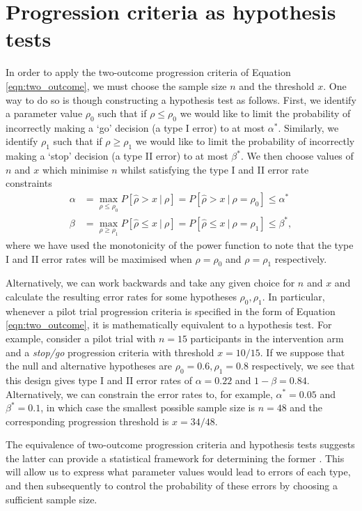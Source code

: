 \documentclass[sagev]{sagej}
\begin{document}
\section{Progression criteria as hypothesis tests}\label{sec:tests}

In order to apply the two-outcome progression criteria of Equation \ref{eqn:two_outcome}, we must choose the sample size $n$ and the threshold $x$. One way to do so is though constructing a hypothesis test as follows. First, we identify a parameter value $\rho_0$ such that if $\rho \leq \rho_0$ we would like to limit the probability of incorrectly making a `go' decision (a type I error) to at most $\alpha^*$. Similarly, we identify $\rho_1$ such that if $\rho \geq \rho_1$ we would like to limit the probability of incorrectly making a `stop' decision (a type II error) to at most $\beta^*$. We then choose values of $n$ and $x$ which minimise $n$ whilst satisfying the type I and II error rate constraints
\begin{align}
\alpha &= \max_{\rho \leq \rho_0} P[ \hat{\rho} > x ~ | ~ \rho] = P[ \hat{\rho} > x ~ | ~ \rho = \rho_0] \leq \alpha^* \\
\beta &= \max_{\rho \geq \rho_1} P[ \hat{\rho} \leq x ~ | ~ \rho] = P[ \hat{\rho} \leq x ~ | ~ \rho = \rho_1] \leq \beta^*,
\end{align}
where we have used the monotonicity of the power function to note that the type I and II error rates will be maximised when $\rho = \rho_0$ and $\rho = \rho_1$ respectively.

Alternatively, we can work backwards and take any given choice for $n$ and $x$ and calculate the resulting error rates for some hypotheses $\rho_0, \rho_1$. In particular, whenever a pilot trial progression criteria is specified in the form of Equation \ref{eqn:two_outcome}, it is mathematically equivalent to a hypothesis test. For example, consider a pilot trial with $n = 15$ participants in the intervention arm and a \emph{stop/go} progression criteria with threshold $x = 10/15$. If we suppose that the null and alternative hypotheses are $\rho_0 = 0.6, \rho_1 = 0.8$ respectively, we see that this design gives type I and II error rates of $\alpha = 0.22$ and $1 - \beta = 0.84$. Alternatively, we can constrain the error rates to, for example, $\alpha^* = 0.05$ and $\beta^* = 0.1$, in which case the smallest possible sample size is $n = 48$ and the corresponding progression threshold is $x = 34/48$. 

The equivalence of two-outcome progression criteria and hypothesis tests suggests the latter can provide a statistical framework for determining the former \cite{Lewis2021a}. This will allow us to express what parameter values would lead to errors of each type, and then subsequently to control the probability of these errors by choosing a sufficient sample size.
\end{document}
